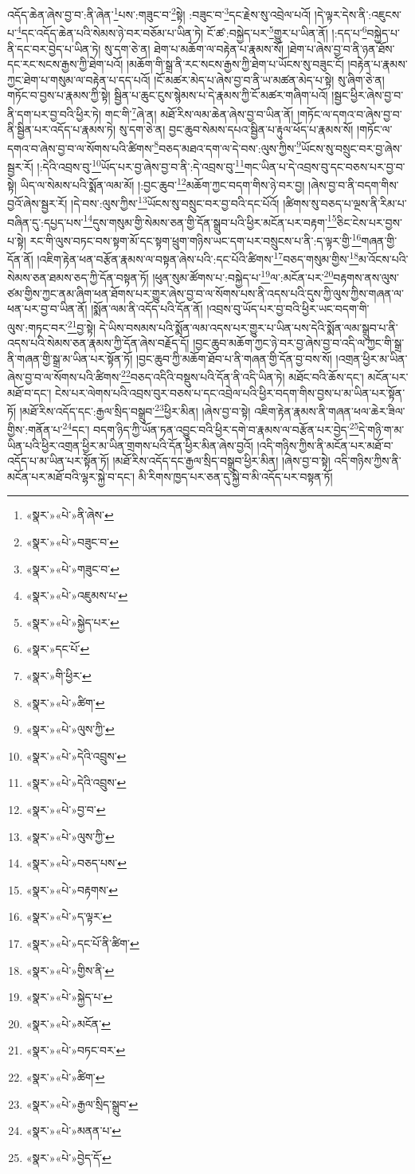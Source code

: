 འདོད་ཆེན་ཞེས་བྱ་བ་:ནི་ཞེན་\footnote{«སྣར་»«པེ་»ནི་ཞེས་}པས་:གཟུང་བ་\footnote{«སྣར་»«པེ་»བཟུང་བ་}སྟེ། :བཟུང་བ་\footnote{«སྣར་»«པེ་»གཟུང་བ་}དང་རྗེས་སུ་འབྲེལ་པའོ། །དེ་ལྟར་དེས་ནི་:འཇུངས་པ་\footnote{«སྣར་»«པེ་»འཇུམས་པ་}དང་འདོད་ཆེན་པའི་སེམས་ཉེ་བར་བཅོམ་པ་ཡིན་ཏེ། ངོ་ཚ་:བསྐྱེད་པར་\footnote{«སྣར་»«པེ་»སྐྱེད་པར་}གྱུར་པ་ཡིན་ནོ། །:དད་པ་\footnote{«སྣར་»དང་པོ་}བསྐྱེད་པ་ནི་དང་བར་བྱེད་པ་ཡིན་ཏེ། སུ་དག་ཅེ་ན། ཐེག་པ་མཆོག་ལ་བརྟེན་པ་རྣམས་སོ། །ཐེག་པ་ཞེས་བྱ་བ་ནི་ཉན་ཐོས་དང་རང་སངས་རྒྱས་ཀྱི་ཐེག་པའོ། །མཆོག་གི་སྒྲ་ནི་རང་སངས་རྒྱས་ཀྱི་ཐེག་པ་ཡོངས་སུ་བཟུང་ངོ། །བརྟེན་པ་རྣམས་ཀྱང་ཐེག་པ་གསུམ་ལ་བརྟེན་པ་དད་པའོ། །ངོ་མཚར་མེད་པ་ཞེས་བྱ་བ་ནི་ཡ་མཚན་མེད་པ་སྟེ། སུ་ཞིག་ཅེ་ན། གཏོང་བ་བྱས་པ་རྣམས་ཀྱི་སྟེ། སྦྱིན་པ་ཆུང་ངུས་སྙེམས་པ་དེ་རྣམས་ཀྱི་ངོ་མཚར་གཞིག་པའོ། །སྦྱང་ཕྱིར་ཞེས་བྱ་བ་ནི་དག་པར་བྱ་བའི་ཕྱིར་ཏེ། གང་གི་\footnote{«སྣར་»གི་ཕྱིར་}ཞེ་ན། མཐོ་རིས་ལམ་ཆེན་ཞེས་བྱ་བ་ཡིན་ནོ། །གཏོང་ལ་དགའ་བ་ཞེས་བྱ་བ་ནི་སྦྱིན་པར་འདོད་པ་རྣམས་ཏེ། སུ་དག་ཅེ་ན། བྱང་ཆུབ་སེམས་དཔའ་སྦྱིན་པ་རྟུལ་ཕོད་པ་རྣམས་སོ། །གཏོང་ལ་དགའ་བ་ཞེས་བྱ་བ་ལ་སོགས་པའི་ཚིགས་\footnote{«སྣར་»«པེ་»ཚིག་}བཅད་མཐའ་དག་ལ་དེ་བས་:ལུས་ཀྱིས་\footnote{«སྣར་»«པེ་»ལུས་ཀྱི་}ཡོངས་སུ་བསྲུང་བར་བྱ་ཞེས་སྦྱར་རོ། །:དེའི་འབྲས་བུ་\footnote{«སྣར་»«པེ་»དེའི་འབྲུས་}ཡོད་པར་བྱ་ཞེས་བྱ་བ་ནི་:དེ་འབྲས་བུ་\footnote{«སྣར་»«པེ་»དེའི་འབྲུས་}གང་ཡིན་པ་དེ་འབྲས་བུ་དང་བཅས་པར་བྱ་བ་སྟེ། ཡིད་ལ་སེམས་པའི་སྨོན་ལམ་མོ། །:བྱང་ཆུབ་\footnote{«སྣར་»«པེ་»བྱ་བ་}མཆོག་ཀྱང་བདག་གིས་ཉེ་བར་བྱ། །ཞེས་བྱ་བ་ནི་བདག་གིས་བྱའོ་ཞེས་སྦྱར་རོ། །དེ་བས་:ལུས་ཀྱིས་\footnote{«སྣར་»«པེ་»ལུས་ཀྱི་}ཡོངས་སུ་བསྲུང་བར་བྱ་བའི་དང་པོའོ། །ཚིགས་སུ་བཅད་པ་ལྔས་ནི་རིམ་པ་བཞིན་དུ་:དཔྱད་པས་\footnote{«སྣར་»«པེ་»བཅད་པས་}དུས་གསུམ་གྱི་སེམས་ཅན་གྱི་དོན་སྒྲུབ་པའི་ཕྱིར་མངོན་པར་བརྟག་\footnote{«སྣར་»«པེ་»བརྟགས་}ཅིང་ངེས་པར་བྱས་པ་སྟེ། རང་གི་ལུས་བཏང་བས་སྟག་མོ་དང་སྟག་ཕྲུག་གཉིས་ཡང་དག་པར་བསྲུངས་པ་ནི་:ད་ལྟར་གྱི་\footnote{«སྣར་»«པེ་»ད་ལྟར་}གཞན་གྱི་དོན་ནོ། །འཇིག་རྟེན་ཕན་བརྩོན་རྣམས་ལ་བསྟན་ཞེས་པའི་:དང་པོའི་ཚིགས་\footnote{«སྣར་»«པེ་»དང་པོ་ནི་ཚིག་}བཅད་གསུམ་གྱིས་\footnote{«སྣར་»«པེ་»གྱིས་ནི་}མ་འོངས་པའི་སེམས་ཅན་ཐམས་ཅད་ཀྱི་དོན་བསྟན་ཏོ། །ཕུན་སུམ་ཚོགས་པ་:བསྐྱེད་པ་\footnote{«སྣར་»«པེ་»སྐྱེད་པ་}ལ་:མངོན་པར་\footnote{«སྣར་»«པེ་»མངོན་}བརྟགས་ནས་ལུས་ཙམ་གྱིས་ཀྱང་ནམ་ཞིག་ཕན་ཐོགས་པར་གྱུར་ཞེས་བྱ་བ་ལ་སོགས་པས་ནི་འདས་པའི་དུས་ཀྱི་ལུས་ཀྱིས་གཞན་ལ་ཕན་པར་བྱ་བ་ཡིན་ནོ། །སྨོན་ལམ་ནི་འདོད་པའི་དོན་ནོ། །འབྲས་བུ་ཡོད་པར་བྱ་བའི་ཕྱིར་ཡང་བདག་གི་ལུས་:གཏང་བར་\footnote{«སྣར་»«པེ་»བཏང་བར་}བྱ་སྟེ། དེ་ཡིས་བསམས་པའི་སྨོན་ལམ་འདས་པར་གྱུར་པ་ཡིན་པས་དེའི་སྨོན་ལམ་སྒྲུབ་པ་ནི་འདས་པའི་སེམས་ཅན་རྣམས་ཀྱི་དོན་ཞེས་བརྗོད་དོ། །བྱང་ཆུབ་མཆོག་ཀྱང་ཉེ་བར་བྱ་ཞེས་བྱ་བ་འདི་ལ་ཀྱང་གི་སྒྲ་ནི་གཞན་གྱི་སྒྲ་མ་ཡིན་པར་སྟོན་ཏོ། །བྱང་ཆུབ་ཀྱི་མཆོག་ཐོབ་པ་ནི་གཞན་གྱི་དོན་བྱ་བས་སོ། །འགྲན་ཕྱིར་མ་ཡིན་ཞེས་བྱ་བ་ལ་སོགས་པའི་ཚིགས་\footnote{«སྣར་»«པེ་»ཚིག་}བཅད་འདིའི་བསྡུས་པའི་དོན་ནི་འདི་ཡིན་ཏེ། མཐོང་བའི་ཆོས་དང་། མངོན་པར་མཐོ་བ་དང་། ངེས་པར་ལེགས་པའི་འབྲས་བུར་བཅས་པ་དང་འབྲེལ་པའི་ཕྱིར་བདག་གིས་བྱས་པ་མ་ཡིན་པར་སྟོན་ཏོ། །མཐོ་རིས་འདོད་དང་:རྒྱལ་སྲིད་བསྒྲུབ་\footnote{«སྣར་»«པེ་»རྒྱལ་སྲིད་སྒྲུབ་}ཕྱིར་མིན། །ཞེས་བྱ་བ་སྟེ། འཇིག་རྟེན་རྣམས་ནི་གཞན་ཕལ་ཆེར་ཟིལ་གྱིས་:གནོན་པ་\footnote{«སྣར་»«པེ་»མནན་པ་}དང་། བདག་ཉིད་ཀྱི་ཡོན་ཏན་འབྱུང་བའི་ཕྱིར་དགེ་བ་རྣམས་ལ་བརྩོན་པར་བྱེད་\footnote{«སྣར་»«པེ་»བྱེད་དོ་}དེ་གཉི་ག་མ་ཡིན་པའི་ཕྱིར་འགྲན་ཕྱིར་མ་ཡིན་གྲགས་པའི་དོན་ཕྱིར་མིན་ཞེས་བྱའོ། །འདི་གཉིས་ཀྱིས་ནི་མངོན་པར་མཐོ་བ་འདོད་པ་མ་ཡིན་པར་སྟོན་ཏོ། །མཐོ་རིས་འདོད་དང་རྒྱལ་སྲིད་བསྒྲུབ་ཕྱིར་མིན། །ཞེས་བྱ་བ་སྟེ། འདི་གཉིས་ཀྱིས་ནི་མངོན་པར་མཐོ་བའི་ལྷར་སྐྱེ་བ་དང་། མི་རིགས་ཁྱད་པར་ཅན་དུ་སྐྱེ་བ་མི་འདོད་པར་བསྟན་ཏོ། 